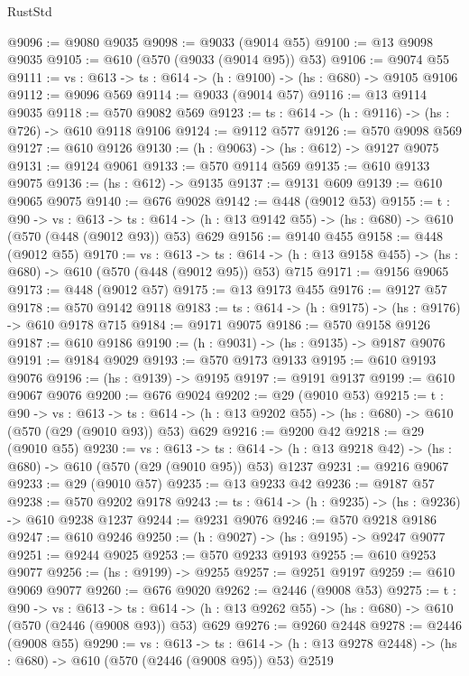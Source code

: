 \begin{lexlean}{RustStd}
\begin{coremodule}
@9096 := @9080 @9035
@9098 := @9033 (@9014 @55)
@9100 := @13 @9098 @9035
@9105 := @610 (@570 (@9033 (@9014 @95)) @53)
@9106 := @9074 @55
@9111 := {vs : @613} -> {ts : @614} -> (h : @9100) -> (hs : @680) -> @9105 @9106
@9112 := @9096 @569
@9114 := @9033 (@9014 @57)
@9116 := @13 @9114 @9035
@9118 := @570 @9082 @569
@9123 := {ts : @614} -> (h : @9116) -> (hs : @726) -> @610 @9118 @9106
@9124 := @9112 @577
@9126 := @570 @9098 @569
@9127 := @610 @9126
@9130 := (h : @9063) -> (hs : @612) -> @9127 @9075
@9131 := @9124 @9061
@9133 := @570 @9114 @569
@9135 := @610 @9133 @9075
@9136 := (hs : @612) -> @9135
@9137 := @9131 @609
@9139 := @610 @9065 @9075
@9140 := @676 @9028
@9142 := @448 (@9012 @53)
@9155 := {t : @90} ->
  {vs : @613} ->
  {ts : @614} -> (h : @13 @9142 @55) -> (hs : @680) -> @610 (@570 (@448 (@9012 @93)) @53) @629
@9156 := @9140 @455
@9158 := @448 (@9012 @55)
@9170 := {vs : @613} ->
  {ts : @614} -> (h : @13 @9158 @455) -> (hs : @680) -> @610 (@570 (@448 (@9012 @95)) @53) @715
@9171 := @9156 @9065
@9173 := @448 (@9012 @57)
@9175 := @13 @9173 @455
@9176 := @9127 @57
@9178 := @570 @9142 @9118
@9183 := {ts : @614} -> (h : @9175) -> (hs : @9176) -> @610 @9178 @715
@9184 := @9171 @9075
@9186 := @570 @9158 @9126
@9187 := @610 @9186
@9190 := (h : @9031) -> (hs : @9135) -> @9187 @9076
@9191 := @9184 @9029
@9193 := @570 @9173 @9133
@9195 := @610 @9193 @9076
@9196 := (hs : @9139) -> @9195
@9197 := @9191 @9137
@9199 := @610 @9067 @9076
@9200 := @676 @9024
@9202 := @29 (@9010 @53)
@9215 := {t : @90} ->
  {vs : @613} ->
  {ts : @614} -> (h : @13 @9202 @55) -> (hs : @680) -> @610 (@570 (@29 (@9010 @93)) @53) @629
@9216 := @9200 @42
@9218 := @29 (@9010 @55)
@9230 := {vs : @613} ->
  {ts : @614} -> (h : @13 @9218 @42) -> (hs : @680) -> @610 (@570 (@29 (@9010 @95)) @53) @1237
@9231 := @9216 @9067
@9233 := @29 (@9010 @57)
@9235 := @13 @9233 @42
@9236 := @9187 @57
@9238 := @570 @9202 @9178
@9243 := {ts : @614} -> (h : @9235) -> (hs : @9236) -> @610 @9238 @1237
@9244 := @9231 @9076
@9246 := @570 @9218 @9186
@9247 := @610 @9246
@9250 := (h : @9027) -> (hs : @9195) -> @9247 @9077
@9251 := @9244 @9025
@9253 := @570 @9233 @9193
@9255 := @610 @9253 @9077
@9256 := (hs : @9199) -> @9255
@9257 := @9251 @9197
@9259 := @610 @9069 @9077
@9260 := @676 @9020
@9262 := @2446 (@9008 @53)
@9275 := {t : @90} ->
  {vs : @613} ->
  {ts : @614} -> (h : @13 @9262 @55) -> (hs : @680) -> @610 (@570 (@2446 (@9008 @93)) @53) @629
@9276 := @9260 @2448
@9278 := @2446 (@9008 @55)
@9290 := {vs : @613} ->
  {ts : @614} -> (h : @13 @9278 @2448) -> (hs : @680) -> @610 (@570 (@2446 (@9008 @95)) @53) @2519

\end{coremodule}
\end{lexlean}
